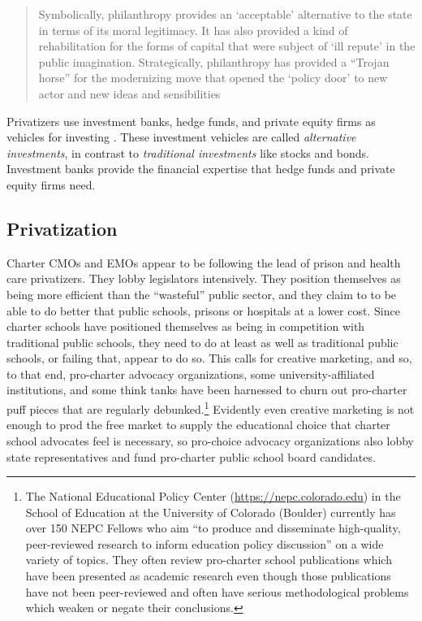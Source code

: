 \blockquote[{\parencite[32]{Ball2012}}][]{\OnehalfSpacing%
Symbolically, philanthropy provides an `acceptable' alternative to the state in terms of its moral legitimacy.  It has also provided a kind of rehabilitation for the forms of capital that were subject of `ill repute' in the public imagination. Strategically, philanthropy has provided a ``Trojan horse'' for the modernizing move that opened the `policy door' to new actor and new ideas and sensibilities}.\vspace{-0.25\baselineskip}
  
Privatizers use investment banks, hedge funds, and private equity firms as vehicles for investing \parencite{Stowell2018}. These investment vehicles are called \textit{alternative investments}, in contrast to \textit{traditional investments} like stocks and bonds. Investment banks provide the financial expertise that hedge funds and private equity firms need. 

\subsection{Privatization}\label{sec:privatization}\indent

Charter CMOs and EMOs appear to be following the lead of prison and health care privatizers. They lobby legislators intensively. They position themselves as being more efficient than the ``wasteful'' public sector, and they claim to to be able to do better that public schools, prisons or hospitals at a lower cost. Since charter schools have positioned themselves as being in competition with traditional public schools, they need to do at least as well as traditional public schools, or failing that, appear to do so. This calls for creative marketing, and so, to that end, pro-charter advocacy organizations, some university-affiliated institutions, and some think tanks have been harnessed to churn out pro-charter puff pieces that are regularly debunked.\footnote{The National Educational Policy Center (\url{https://nepc.colorado.edu}) in the School of Education at the University of Colorado (Boulder) currently has over 150 NEPC Fellows who aim ``to produce and disseminate high-quality, peer-reviewed research to inform education policy discussion'' on a wide variety of topics. They often review pro-charter school publications which have been presented as academic research even though those publications have not been peer-reviewed and often have serious methodological problems which weaken or negate their conclusions.} Evidently even creative marketing is not enough to prod the free market to supply the educational choice that charter school advocates feel is necessary, so pro-choice advocacy organizations also lobby state representatives and fund pro-charter public school board candidates.

